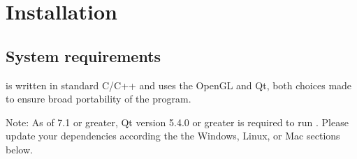 \section{Installation}

\subsection{System requirements}

\map{} is written in standard C/C++ and uses the OpenGL and Qt, both choices made to ensure broad portability of the program.

Note: As of \map{} 7.1 or greater, Qt version 5.4.0 or greater is required
to run \map{}.  Please update your dependencies according the the 
Windows, Linux, or Mac sections below.

